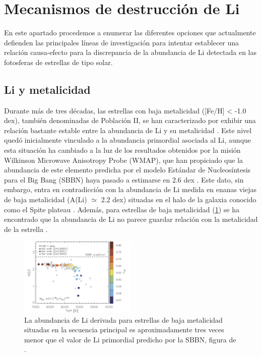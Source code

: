 \section{Mecanismos de destrucción de Li}
En este apartado procedemos a enumerar las diferentes opciones que actualmente defienden las principales líneas de investigación para intentar establecer una relación causa-efecto para la discrepancia de la abundancia de Li detectada en las fotosferas de estrellas de tipo solar.\par

\subsection{Li y metalicidad}
Durante más de tres décadas, las estrellas con baja metalicidad ([Fe/H] < -1.0 dex), también denominadas de Población II, se han caracterizado por exhibir una relación bastante estable entre la abundancia de Li y su metalicidad \cite{Guiglion2016}. Este nivel quedó inicialmente vinculado a la abundancia primordial asociada al Li, aunque esta situación ha cambiado a la luz de los resultados obtenidos por la misión Wilkinson Microwave Anisotropy Probe (WMAP), que han propiciado que la abundancia de este elemento predicha por el modelo Estándar de Nucleosíntesis para el Big Bang (SBBN) haya pasado a estimarse en 2.6 dex \cite{Spergel2003}. Este dato, sin embargo, entra en contradicción con la abundancia de Li medida en enanas viejas de baja metalicidad  (A(Li) $\simeq$ 2.2 dex) situadas en el halo de la galaxia conocido como el Spite plateau \cite{Spite1982}. Además, para estrellas de baja metalicidad (\ref{fig:li_abundances_sbbn}) se ha encontrado que la abundancia de Li no parece guardar relación con la metalicidad de la estrella \cite{Fu2015}.\par


\begin{figure}
	\centering
	\includegraphics[width=0.5\textwidth]{img/tesis/li_abundances_sbbn.pdf}
	\caption{La abundancia de Li derivada para estrellas de baja metalicidad situadas en la secuencia principal es aproximadamente tres veces menor que el valor de Li primordial predicho por la SBBN, figura de \cite{Fu2015}.}
	\label{fig:li_abundances_sbbn}
\end{figure}

